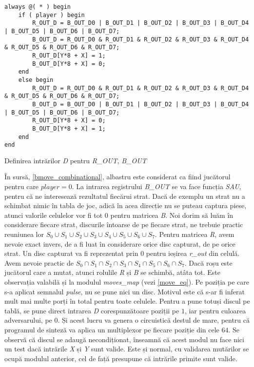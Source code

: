 \documentclass[12pt,twoside,a4paper,fleqn]{book}
\theoremstyle{definition}
\begin{document}
\begin{fragmentsursa}
\begin{scriptsize}
\begin{verbatim}
always @( * ) begin
    if ( player ) begin
        R_OUT_D = B_OUT_D0 | B_OUT_D1 | B_OUT_D2 | B_OUT_D3 | B_OUT_D4 | B_OUT_D5 | B_OUT_D6 | B_OUT_D7;
        B_OUT_D = R_OUT_D0 & R_OUT_D1 & R_OUT_D2 & R_OUT_D3 & R_OUT_D4 & R_OUT_D5 & R_OUT_D6 & R_OUT_D7;
        R_OUT_D[Y*8 + X] = 1;
        B_OUT_D[Y*8 + X] = 0;
    end
    else begin
        R_OUT_D = R_OUT_D0 & R_OUT_D1 & R_OUT_D2 & R_OUT_D3 & R_OUT_D4 & R_OUT_D5 & R_OUT_D6 & R_OUT_D7;
        B_OUT_D = B_OUT_D0 | B_OUT_D1 | B_OUT_D2 | B_OUT_D3 | B_OUT_D4 | B_OUT_D5 | B_OUT_D6 | B_OUT_D7;
        R_OUT_D[Y*8 + X] = 0;
        B_OUT_D[Y*8 + X] = 1;
    end
end
\end{verbatim}
\end{scriptsize}
\caption{Definirea intrărilor \emph{D} pentru \emph{R\_OUT}, \emph{B\_OUT}}
\label{bmove_combinational}
\end{fragmentsursa}
În sursă, \ref{bmove_combinational}, albastru este considerat ca fiind jucătorul pentru care $player = 0$. La intrarea registrului \emph{B\_OUT} se va face funcția \emph{SAU}, pentru că ne interesează rezultatul fiecărui strat. Dacă de exemplu un strat nu a schimbat nimic în tabla de joc, adică în acea direcție nu se puteau captura piese, atunci valorile celulelor vor fi tot $0$ pentru matricea \emph{B}. Noi dorim să luăm în considerare fiecare strat, discurile întoarse de pe fiecare strat, ne trebuie practic reuniunea lor $S_{0} \cup S_{1} \cup S_{2} \cup S_{3} \cup S_{4} \cup S_{5} \cup S_{6} \cup S_{7}$. Pentru matricea \emph{R}, avem nevoie exact invers, de a fi luat în considerare orice disc capturat, de pe orice strat. Un disc capturat va fi reprezentat prin $0$ pentru ieșirea \emph{r\_out} din celulă. Avem nevoie practic de $S_{0} \cap S_{1} \cap S_{2} \cap S_{3} \cap S_{4} \cap S_{5} \cap S_{6} \cap S_{7}$. Dacă roșu este jucătorul care a mutat, atunci rolulile \emph{R} și \emph{B} se schimbă, atâta tot. Este observația valabilă și la modulul \emph{moves\_map} (vezi \ref{move_eq}). Pe poziția pe care s-a aplicat semnalul \emph{pulse}, nu se pune nici un disc. Motivul este că s-ar fi inferat mult mai multe porți în total pentru toate celulele. Pentru a pune totuși discul pe tablă, se pune direct intrarea \emph{D} corespunzătoare poziții pe $1$, iar pentru culoarea adversarului, pe $0$. Și acest lucru va genera o circuistică destul de mare, pentru că programul de sinteză va aplica un multiplexor pe fiecare poziție din cele $64$. Se observă că discul se adaugă necondiționat, înseamnă că acest modul nu face nici un test dacă intrările \emph{X} și \emph{Y} sunt valide. Este și normal, cu validarea mutărilor se ocupă modulul anterior, cel de față presupune că intrările primite sunt valide.
\end{document}
